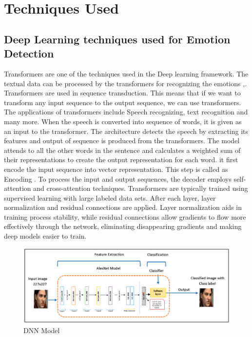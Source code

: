 \documentclass[conference]{IEEEtran}
\begin{document}
\section{Techniques Used}

\subsection{Deep Learning techniques used for Emotion Detection}

Transformers are one of the techniques used in the Deep learning framework. The textual data can be processed by the transformers for recognizing the emotions \cite{karatay2022multi},\cite{le2023multi}. 
Transformers are used in sequence transduction. This means that if we want to transform any input sequence to the output sequence, we can use transformers. The applications of transformers include Speech recognizing, text recognition and many more. When the speech is converted into sequence of words, it is given as an input to the transformer. The architecture detects the speech by extracting its features and output of sequence is produced from the transformers. The model attends to all the other words in the sentence and calculates a weighted sum of their representations to create the output representation for each word. it first encode the input sequence into vector representation. This step is called as Encoding \cite{huang2020multimodal}.
To process the input and output sequences, the decoder employs self-attention and cross-attention techniques. Transformers are typically trained using supervised learning with large labeled data sets. After each layer, layer normalization and residual connections are applied. Layer normalization aids in training process stability, while residual connections allow gradients to flow more effectively through the network, eliminating disappearing gradients and making deep models easier to train.\cite{lian2021ctnet} 

\begin{figure}
\centerline{\includegraphics[scale=0.07]{DNNmodel.png}}
\caption{DNN Model \cite{app9204397}}
\end{figure}
\end{document}
